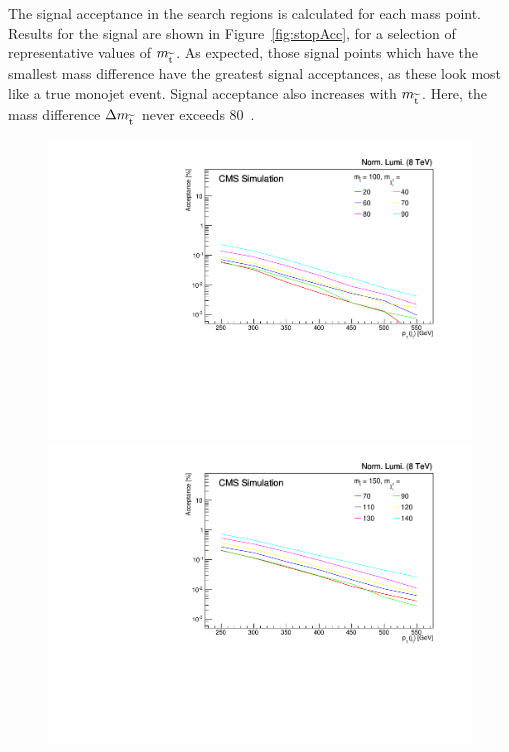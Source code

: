 The signal acceptance in the search regions is calculated for each mass point. 
Results for the \sTop signal are shown in Figure~\ref{fig:stopAcc}, for a selection of representative values of $m_{\widetilde{{\rm t}}\,}$.
As expected, those signal points which have the smallest mass difference \dmstop have the greatest signal acceptances, as these look most like a true monojet event. 
Signal acceptance also increases with $m_{\widetilde{{\rm t}}\,}$.
Here, the mass difference $\Delta m_{\widetilde{{\rm t}}\,}$ never exceeds 80~\GeV.


\begin{figure}[ht!]
  \begin{center}
  \includegraphics[scale=0.35]{Figures/sus13009/limitplots/plots/stop/acceptance_100.pdf}
  \includegraphics[scale=0.35]{Figures/sus13009/limitplots/plots/stop/acceptance_150.pdf}

\end{center}
\end{figure}
